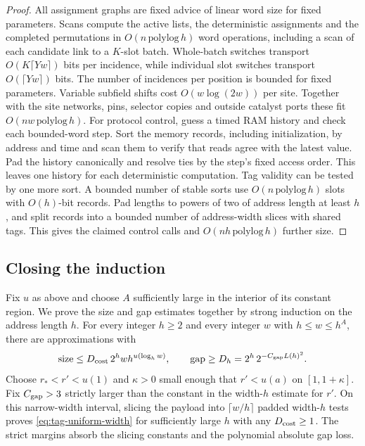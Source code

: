 \begin{proof}
All assignment graphs are fixed advice of linear word size for fixed
parameters. Scans compute the active lists, the deterministic assignments
and the completed permutations in $O(n\,\mathrm{polylog}\,h)$ word
operations, including a scan of each candidate link to a $K$-slot
batch. Whole-batch switches transport $O(K\lceil Yw\rceil)$ bits per
incidence, while individual slot switches transport $O(\lceil Yw\rceil)$
bits. The number of incidences per position is bounded for fixed
parameters. Variable subfield shifts cost $O(w\log(2w))$ per site.
Together with the site networks, pins, selector copies and outside
catalyst ports these fit $O(nw\,\mathrm{polylog}\,h)$. For protocol
control, guess a timed RAM history and check each bounded-word step.
Sort the memory records, including initialization, by address and time
and scan them to verify that reads agree with the latest value. Pad the
history canonically and resolve ties by the step's fixed access order.
This leaves one history for each deterministic computation. Tag validity
can be tested by one more sort. A bounded
number of stable sorts use $O(n\,\mathrm{polylog}\,h)$ slots with
$O(h)$-bit records. Pad lengths to powers of two of address length at
least $h$, and split records into a bounded number of address-width
slices with shared tags. This gives the claimed control calls and
$O(nh\,\mathrm{polylog}\,h)$ further size.
\end{proof}

\subsection{Closing the induction}

Fix $u$ as above and choose $A$ sufficiently large in the interior of
its constant region. We prove the size and gap estimates together by
strong induction on the address length $h$. For every integer $h\ge2$
and every integer $w$ with
$h\le w\le h^A$, there are approximations with
\begin{equation}\label{eq:tag-uniform-width}
  \text{size}\le D_{\rm cost}\,2^h w h^{u(\log_h w)},\qquad
  \text{gap}\ge D_h=2^h\,2^{-C_{\rm gap}L(h)^2}.
\end{equation}
Choose $r_*<r'<u(1)$ and $\kappa>0$ small enough that $r'<u(a)$ on
$[1,1+\kappa]$. Fix $C_{\rm gap}>3$ strictly larger than the constant
in the width-$h$ estimate for $r'$. On this narrow-width interval,
slicing the payload into $\lceil w/h\rceil$ padded width-$h$ tests
proves \eqref{eq:tag-uniform-width} for sufficiently large $h$ with
any $D_{\rm cost}\ge1$. The strict margins absorb the slicing constants
and the polynomial absolute gap loss.

